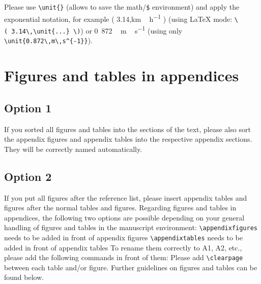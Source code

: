 \documentclass[gc, manuscript]{copernicus}
\begin{document}
Please use \texttt{\textbackslash{}unit\{\}} (allows to save the
math/\texttt{\$} environment) and apply the exponential notation, for
example ( 3.14,\unit{km\,h^{-1}} ) (using LaTeX mode:
\texttt{\textbackslash{}(\ 3.14\textbackslash{},\textbackslash{}unit\{...\}\ \textbackslash{})})
or \unit{0.872\,m\,s^{-1}} (using only
\texttt{\textbackslash{}unit\{0.872\textbackslash{},m\textbackslash{},s\^{}\{-1\}\}}).








\appendix
\section{Figures and tables in appendices}\subsection{Option 1}

If you sorted all figures and tables into the sections of the text,
please also sort the appendix figures and appendix tables into the
respective appendix sections. They will be correctly named
automatically. \subsection{Option 2} If you put all figures after the
reference list, please insert appendix tables and figures after the
normal tables and figures. Regarding figures and tables in appendices,
the following two options are possible depending on your general
handling of figures and tables in the manuscript environment:
\texttt{\textbackslash{}appendixfigures} needs to be added in front of
appendix figures \texttt{\textbackslash{}appendixtables} needs to be
added in front of appendix tables To rename them correctly to A1, A2,
etc., please add the following commands in front of them: Please add
\texttt{\textbackslash{}clearpage} between each table and/or figure.
Further guidelines on figures and tables can be found below.
\noappendix


\end{document}
